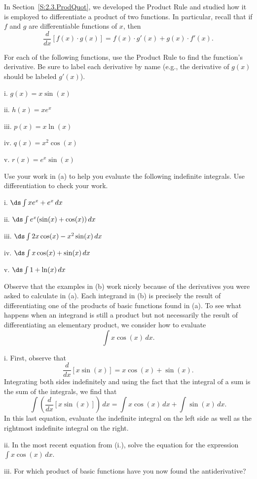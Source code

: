 \begin{pa} \label{PA:5.4}
In Section~\ref{S:2.3.ProdQuot}, we developed the Product Rule and studied how it is employed to differentiate a product of two functions.  In particular, recall that if $f$ and $g$ are differentiable functions of $x$, then
$$\frac{d}{dx} \left[ f(x) \cdot g(x)  \right] = f(x) \cdot g'(x) + g(x) \cdot f'(x).$$ 
\ba
	\item For each of the following functions, use the Product Rule to find the function's derivative.  Be sure to label each derivative by name (e.g., the derivative of $g(x)$ should be labeled $g'(x)$).
	\be
		\item[i.] $g(x) = x\sin(x)$
		\item[ii.] $h(x) = xe^x$
		\item[iii.] $p(x) = x\ln(x)$
		\item[iv.] $q(x) = x^2 \cos(x)$
		\item[v.] $r(x) = e^x \sin(x)$
	\ee
	\item Use your work in (a) to help you evaluate the following indefinite integrals.  Use differentiation to check your work.
	\be
		\item[i.] $\ds \int xe^x + e^x \, dx$
		\item[ii.] $\ds \int e^x(\sin(x) + \cos(x)) \, dx$
		\item[iii.] $\ds \int 2x\cos(x) - x^2 \sin(x) \, dx$
		\item[iv.] $\ds \int x\cos(x) + \sin(x) \, dx$
		\item[v.] $\ds \int 1 + \ln(x) \, dx$
	\ee
	\item Observe that the examples in (b) work nicely because of the derivatives you were asked to calculate in (a).  Each integrand in (b) is precisely the result of differentiating one of the products of basic functions found in (a).  To see what happens when an integrand is still a product but not necessarily the result of differentiating an elementary product, we consider how to evaluate 
	$$\int x\cos(x) \, dx.$$
	\be
		\item[i.] First, observe that 
		$$\frac{d}{dx} \left[ x\sin(x) \right] = x\cos(x) + \sin(x).$$
		Integrating both sides indefinitely and using the fact that the integral of a sum is the sum of the integrals, we find that
		$$\int \left(\frac{d}{dx} \left[ x\sin(x) \right] \right) \, dx = \int  x\cos(x) \, dx +  \int \sin(x) \, dx.$$
		In this last equation, evaluate the indefinite integral on the left side as well as the rightmost indefinite integral on the right.
		\item[ii.] In the most recent equation from (i.), solve the equation for the expression $\int x \cos(x) \, dx$.
		\item[iii.] For which product of basic functions have you now found the antiderivative?
	\ee
\ea
\end{pa} 
\afterpa